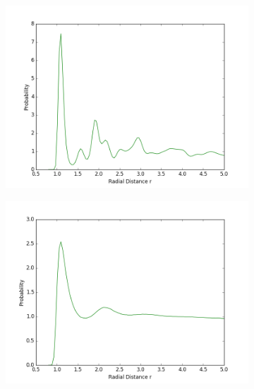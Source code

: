 \begin{figure}[ht]
\begin{subfigure}{0.3\textwidth}
\includegraphics[width=\textwidth]{fig/meanRDF_T0d3.png}
\end{subfigure}
\hfill
\begin{subfigure}{0.3\textwidth}
\includegraphics[width=\textwidth]{fig/meanRDF_T1d0.png}
\end{subfigure}
\hfill
\begin{subfigure}{0.3\textwidth}

\end{subfigure}
\end{figure}
